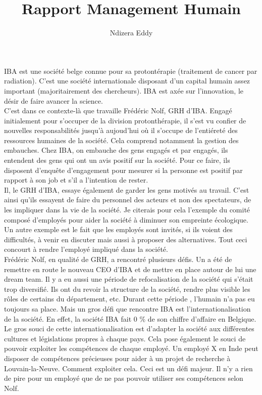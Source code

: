 \documentclass[12pt]{report}
\title{Rapport Management Humain}
\author{Ndizera Eddy}
\begin{document}
\maketitle

IBA est une société belge connue pour sa protontérapie (traitement de cancer par radiation). C'est une société internationale disposant d'un capital humain assez important (majoritairement des chercheurs). IBA est axée sur l'innovation, le désir de faire avancer la science.\\

C'est dans ce contexte-là que travaille Frédéric Nolf, GRH d'IBA. Engagé initialement pour s'occuper de la division protonthérapie, il s'est vu confier de nouvelles responsabilités jusqu'à aujoud'hui où il s'occupe de l'entiéreté des ressources humaines de la société. Cela comprend notamment la gestion des embauches. Chez IBA, on embauche des gens engagés et par engagés, ils entendent des gens qui ont un avis positif sur la société. Pour ce faire, ils disposent d'enquête d'engagement pour mesurer si la personne est positif par rapport à son job et s'il a l'intention de rester.\\

Il, le GRH d'IBA, essaye également de garder les gens motivés au travail. C'est ainsi qu'ils essayent de faire du personnel des acteurs et non des spectateurs, de les impliquer dans la vie de la société. Je citerais pour cela l'exemple du comité composé d'employés pour  aider la société à diminuer son empreinte écologique. Un autre exemple est le fait que les employés sont invités, si ils voient des difficultés, à venir en discuter mais aussi à proposer des alternatives. Tout ceci concourt à rendre l'employé impliqué dans la société. \\

Frédéric Nolf, en qualité de GRH, a rencontré plusieurs défis. Un a été de remettre en route le nouveau CEO d'IBA et de mettre en place autour de lui une dream team. Il y a eu aussi une période de refocalisation de la société qui s'était trop diversifié. Ils ont du revoir la structure de la société, rendre plus visible les rôles de certains du département, etc. Durant cette période , l'humain n'a pas eu toujours sa place. Mais un gros défi que rencontre IBA est l'internationalisation de la société. En effet, la société IBA fait 0 \% de son chiffre d'affaire en Belgique. Le gros souci de cette internationalisation est d'adapter la société aux différentes cultures et législations propres à chaque pays. Cela pose également le souci de pouvoir exploiter les compétences de chaque employé. Un employé X en Inde peut disposer de compétences précieuses pour aider à un projet de recherche à Louvain-la-Neuve. Comment exploiter cela. Ceci est un défi majeur. Il n'y a rien de pire pour un employé que de ne pas pouvoir utiliser ses compétences selon Nolf.\\
\end{document}
